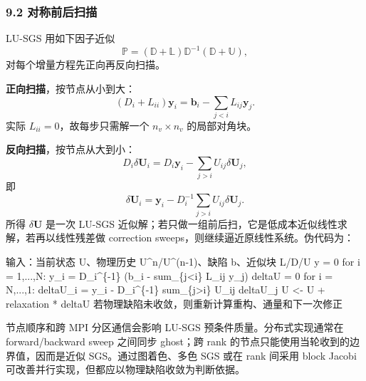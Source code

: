 \documentclass[
  12pt,
  UTF8]{ctexart}
\newenvironment{Shaded}{}{}
\newcommand{\NormalTok}[1]{#1}
\begin{document}
\hypertarget{ux5bf9ux79f0ux524dux540eux626bux63cf}{%
\subsubsection{9.2
对称前后扫描}\label{ux5bf9ux79f0ux524dux540eux626bux63cf}}

LU-SGS 用如下因子近似 \begin{equation}
\mathbb P=(\mathbb D+\mathbb L)\mathbb D^{-1}(\mathbb D+\mathbb U),\end{equation} 对每个增量方程先正向再反向扫描。

\textbf{正向扫描}，按节点从小到大： \begin{equation}
(D_i+L_{ii})\boldsymbol y_i=
\boldsymbol b_i-\sum_{j<i}L_{ij}\boldsymbol y_j.\end{equation} 实际 \(L_{ii}=0\)，故每步只需解一个 \(n_v\times n_v\) 的局部对角块。

\textbf{反向扫描}，按节点从大到小： \begin{equation}
D_i\delta\boldsymbol U_i=
D_i\boldsymbol y_i-\sum_{j>i}U_{ij}\delta\boldsymbol U_j,\end{equation} 即 \begin{equation}
\delta\boldsymbol U_i=\boldsymbol y_i-
D_i^{-1}\sum_{j>i}U_{ij}\delta\boldsymbol U_j.\end{equation} 所得 \(\delta\boldsymbol U\) 是一次 LU-SGS
近似解；若只做一组前后扫，它是低成本近似线性求解，若再以线性残差做
correction sweeps，则继续逼近原线性系统。伪代码为：

\begin{Shaded}
\begin{Highlighting}[]
\NormalTok{输入：当前状态 U、物理历史 U\^{}n/U\^{}(n{-}1)、缺陷 b、近似块 L/D/U}
\NormalTok{y = 0}
\NormalTok{for i = 1,...,N:}
\NormalTok{    y\_i = D\_i\^{}\{{-}1\} (b\_i {-} sum\_\{j\textless{}i\} L\_ij y\_j)}
\NormalTok{deltaU = 0}
\NormalTok{for i = N,...,1:}
\NormalTok{    deltaU\_i = y\_i {-} D\_i\^{}\{{-}1\} sum\_\{j\textgreater{}i\} U\_ij deltaU\_j}
\NormalTok{U \textless{}{-} U + relaxation * deltaU}
\NormalTok{若物理缺陷未收敛，则重新计算重构、通量和下一次修正}
\end{Highlighting}
\end{Shaded}

节点顺序和跨 MPI 分区通信会影响 LU-SGS 预条件质量。分布式实现通常在
forward/backward sweep 之间同步 ghost；跨 rank
的节点只能使用当轮收到的边界值，因而是近似 SGS。通过图着色、多色 SGS
或在 rank 间采用 block Jacobi
可改善并行实现，但都应以物理缺陷收敛为判断依据。
\end{document}
